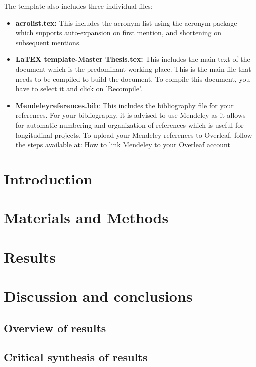 \documentclass[11pt]{article}
\begin{document}
The template also includes three individual files:
\begin{itemize}
\item \textbf{acro\textunderscore list.tex:} This includes the acronym list using the acronym package which supports auto-expansion on first mention, and shortening on subsequent mentions.

\item \textbf{LaTEX template-Master Thesis.tex:} This includes the main text of the document which is the predominant working place. This is the main file that needs to be compiled to build the document. To compile this document, you have to select it and click on 'Recompile'.

\item \textbf{Mendeleyreferences.bib}: This includes the bibliography file for your references. For your bibliography, it is advised to use Mendeley as it allows for automatic numbering and organization of references which is useful for longitudinal projects. To upload your Mendeley references to Overleaf, follow the steps available at: \href{https://www.overleaf.com/learn/how-to/How_to_link_Mendeley_to_your_Overleaf_account}{How to link Mendeley to your Overleaf account}
\end{itemize}

\newpage
\section{Introduction}{\vspace{0.1cm}}


\newpage
\section{Materials and Methods}


\newpage
\section{Results}
\newpage
\section{Discussion and conclusions}
\subsection{Overview of results}

\subsection{Critical synthesis of results}
\end{document}
